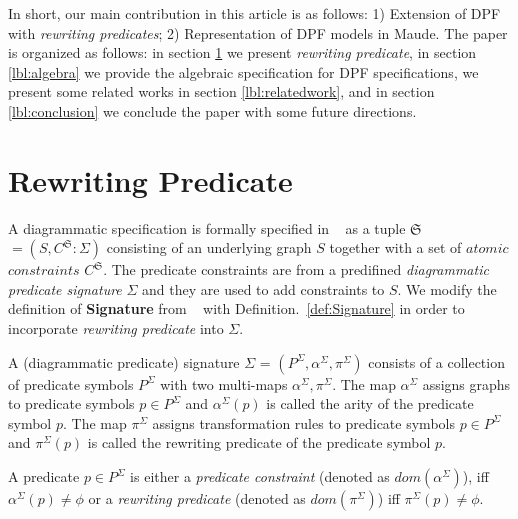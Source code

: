 \documentclass{eceasst}
\begin{document}
In short, our main contribution in this article is as follows: 1) Extension of DPF with \textit{rewriting predicates}; 2) Representation of DPF models in Maude. 
The paper is organized as follows: in section \ref{lbl:rewritingpredicate} we present \textit{rewriting predicate}, in section \ref{lbl:algebra} we provide the algebraic specification for 
DPF specifications, we present some related works in section \ref{lbl:relatedwork}, and 
in section \ref{lbl:conclusion} we conclude the paper with some future directions. 

\section{Rewriting Predicate}\label{lbl:rewritingpredicate}
A diagrammatic specification is formally specified in ~\cite{Rutle10} as a tuple $\mathfrak{S}$ $= (S, C^\mathfrak{S}:\Sigma)$ consisting of an underlying graph $S$ together with a set of 
$atomic$ $constraints$ $C^\mathfrak{S}$. The predicate constraints are from a predifined \textit{diagrammatic predicate signature} $\Sigma$ and they are used to add constraints to $S$. 
We modify the definition of \textbf{Signature} from ~\cite{Rutle10} with Definition.~\ref{def:Signature} in order to incorporate \textit{rewriting predicate} into $\Sigma$.


\begin{definition}[Signature]\label{def:Signature}
 A (diagrammatic predicate) signature $\Sigma$ = $(P^\Sigma, \alpha^\Sigma, \pi^\Sigma)$ consists of a collection of predicate symbols $P^\Sigma$ with two 
 multi-maps $\alpha^\Sigma, \pi^\Sigma$. The map $\alpha^\Sigma$ assigns graphs to predicate symbols $p \in P^\Sigma$ and $\alpha^\Sigma(p)$ is called the arity of the predicate symbol $p$. 
 The map $\pi^\Sigma$ assigns transformation rules to predicate symbols $p \in P^\Sigma$ and $\pi^\Sigma(p)$ is called the rewriting predicate of the predicate symbol $p$. 
\end{definition}

\begin{remark}
A predicate $p \in P^\Sigma$ is either a \textit{predicate constraint} (denoted as $dom(\alpha^\Sigma)$), iff $\alpha^\Sigma(p) \neq \phi$ 
or a \textit{rewriting predicate} (denoted as $dom(\pi^\Sigma)$) iff $\pi^\Sigma(p) \neq \phi$. 
\end{remark}
\end{document}
